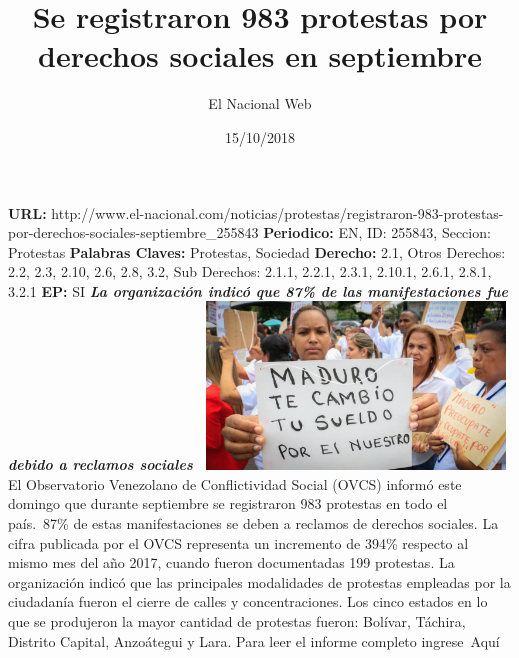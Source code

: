 \documentclass{article}%
\title{\textbf{Se registraron 983 protestas por derechos sociales en septiembre}}%
\author{El Nacional Web}%
\date{15/10/2018}%
\begin{document}
%
\normalsize%
\maketitle%
\textbf{URL: }%
http://www.el{-}nacional.com/noticias/protestas/registraron{-}983{-}protestas{-}por{-}derechos{-}sociales{-}septiembre\_255843\newline%
%
\textbf{Periodico: }%
EN, %
ID: %
255843, %
Seccion: %
Protestas\newline%
%
\textbf{Palabras Claves: }%
Protestas, Sociedad\newline%
%
\textbf{Derecho: }%
2.1, %
Otros Derechos: %
2.2, 2.3, 2.10, 2.6, 2.8, 3.2, %
Sub Derechos: %
2.1.1, 2.2.1, 2.3.1, 2.10.1, 2.6.1, 2.8.1, 3.2.1\newline%
%
\textbf{EP: }%
SI\newline%
\newline%
%
\textbf{\textit{La organización indicó que 87\% de las manifestaciones fue debido a reclamos sociales~}}%
\newline%
\newline%
%
\includegraphics[width=300px]{150.jpg}%
\newline%
%
El Observatorio Venezolano de Conflictividad Social (OVCS) informó este domingo que durante septiembre se registraron 983 protestas en todo el país.~87\% de estas manifestaciones se deben a reclamos de derechos sociales.%
\newline%
%
La cifra publicada por el OVCS representa un incremento de 394\% respecto al mismo mes del año 2017, cuando fueron documentadas 199 protestas.%
\newline%
%
La organización indicó que las principales modalidades de protestas empleadas por la ciudadanía fueron el cierre de calles y concentraciones.%
\newline%
%
Los cinco estados en lo que se produjeron la mayor cantidad de protestas fueron: Bolívar, Táchira, Distrito Capital, Anzoátegui y Lara.%
\newline%
%
Para leer el informe completo ingrese~Aquí%
\newline%
%
\end{document}
